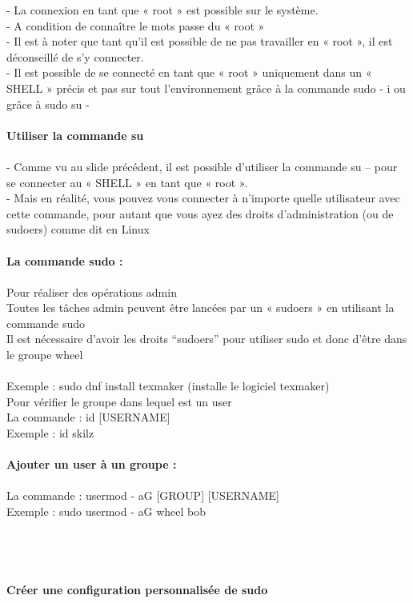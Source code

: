 \documentclass[10pt,a4paper]{article}
\begin{document}
- La connexion en tant que « root » est possible sur le système. \\
- A condition de connaître le mots passe du « root » \\
- Il est à noter que tant qu’il est possible de ne pas travailler en « root », il est déconseillé de s’y connecter.\\
- Il est possible de se connecté en tant que « root » uniquement dans un « SHELL » précis et pas sur tout l’environnement grâce à la commande sudo - i ou grâce à sudo su - \\\\
{\large\textbf{Utiliser la commande su  }}\\\\
- Comme vu au slide précédent, il est possible d’utiliser la commande su – pour se connecter au « SHELL » en tant que « root ».\\
- Mais en réalité, vous pouvez vous connecter à n’importe quelle utilisateur avec cette commande, pour autant que vous ayez des droits d’administration (ou de sudoers) comme dit en Linux\\\\
{\large\textbf{La commande sudo : }}\\\\
Pour réaliser des opérations admin \\
Toutes les tâches admin peuvent être lancées par un « sudoers » en utilisant la commande sudo \\
Il est nécessaire d’avoir les droits “sudoers” pour utiliser sudo et donc d'être dans le groupe wheel\\\\
Exemple : sudo dnf install texmaker (installe le logiciel texmaker)\\
Pour vérifier le groupe dans lequel est un user \\
La commande  : id [USERNAME] \\
Exemple : id skilz\\\\
{\large\textbf{Ajouter un user à un groupe :}}\\\\
La commande : usermod - aG [GROUP] [USERNAME]\\
Exemple : sudo usermod - aG wheel bob\\\\\\\\\\
{\large\textbf{Créer une configuration personnalisée de sudo}}\\\\
\end{document}
